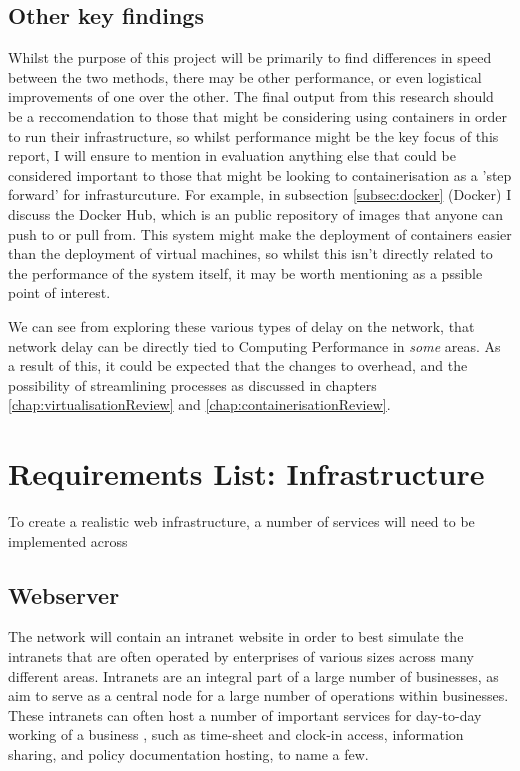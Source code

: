 \begin{itemize}
\subsection{Other key findings}
Whilst the purpose of this project will be primarily to find differences in speed between the two methods, there may be other performance, or even logistical improvements of one over the other. The final output from this research should be a reccomendation to those that might be considering using containers in order to run their infrastructure, so whilst performance might be the key focus of this report, I will ensure to mention in evaluation anything else that could be considered important to those that might be looking to containerisation as a 'step forward' for infrasturcuture. For example, in subsection \ref{subsec:docker} (Docker) I discuss the Docker Hub, which is an public repository of images that anyone can push to or pull from. This system might make the deployment of containers easier than the deployment of virtual machines, so whilst this isn't directly related to the performance of the system itself, it may be worth mentioning as a pssible point of interest.
\end{itemize}

We can see from exploring these various types of delay on the network, that network delay can be directly tied to Computing Performance in \emph{some} areas. As a result of this, it could be expected that the changes to overhead, and the possibility of streamlining processes as discussed in chapters \ref{chap:virtualisationReview} and \ref{chap:containerisationReview}.

\section{Requirements List: Infrastructure}
\label{Requirements:infrastructure}
To create a realistic web infrastructure, a number of services will need to be implemented across 

\subsection{Webserver}
\label{subsec:webserver}
The network will contain an intranet website in order to best simulate the intranets that are often operated by enterprises of various sizes across many different areas. Intranets are an integral part of a large number of businesses, as aim to serve as a central node for a large number of operations within businesses. These intranets can often host a number of important services for day-to-day working of a business \citep{jacoby2005critical}, such as time-sheet and clock-in access, information sharing, and policy documentation hosting, to name a few.

